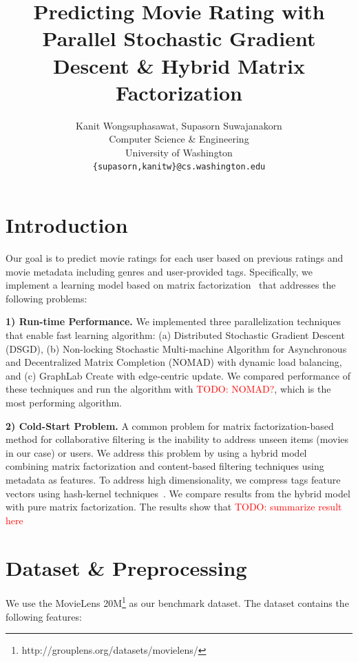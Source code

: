 \documentclass{article} %
\title{Predicting Movie Rating with Parallel Stochastic Gradient Descent \& Hybrid Matrix Factorization}
\author{
Kanit Wongsuphasawat, Supasorn Suwajanakorn \\
Computer Science \& Engineering\\
University of Washington\\
\texttt{\{supasorn,kanitw\}@cs.washington.edu} \\
}
\newcommand{\todo}[1]{\textcolor{red}{TODO: #1}}
\begin{document}
\maketitle

\section{Introduction}

Our goal is to predict movie ratings for each user based on previous ratings
and movie metadata including genres and user-provided tags.
Specifically, we implement a learning model based on matrix
factorization~\cite{koren:matrix} that addresses the following problems:

\textbf{1) Run-time Performance.}
We implemented three parallelization techniques that enable fast
learning algorithm:
(a) Distributed Stochastic Gradient Descent (DSGD),
(b) Non-locking Stochastic Multi-machine Algorithm for Asynchronous and Decentralized Matrix Completion (NOMAD) with dynamic load balancing, and
(c) GraphLab Create with edge-centric update.
We compared performance of these techniques and run the algorithm with
\todo{NOMAD?}, which is the most performing algorithm.


\textbf{2) Cold-Start Problem.}
A common problem for matrix factorization-based method for collaborative
filtering is the inability to address unseen items (movies in our case) or
users.  We address this problem by using a hybrid model combining matrix
factorization and content-based filtering techniques using metadata as
features. To address high dimensionality, we compress tags feature vectors
using hash-kernel techniques~\cite{shi:hashkernels}.  We compare results
from the hybrid model with pure matrix factorization.  The results show that \todo{summarize result here}


\section{Dataset \& Preprocessing}

We use the MovieLens 20M\footnote{http://grouplens.org/datasets/movielens/}
as our benchmark dataset.  The dataset contains the following features:
\end{document}
